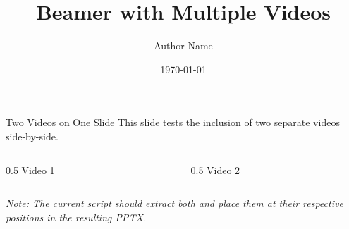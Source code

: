 \documentclass[aspectratio=169]{beamer}
\title{Beamer with Multiple Videos}
\author{Author Name}
\date{\today}
\begin{document}
\begin{frame}
    \titlepage
\end{frame}

\begin{frame}{Two Videos on One Slide}
    This slide tests the inclusion of two separate videos side-by-side.
    
    \begin{columns}
        \begin{column}{0.5\textwidth}
            \centering
            Video 1\\
        \end{column}
        \begin{column}{0.5\textwidth}
            \centering
            Video 2\\
        \end{column}
    \end{columns}
    
    \vspace{0.5cm}
    \textit{Note: The current script should extract both and place them at their respective positions in the resulting PPTX.}
\end{frame}
\end{document}
